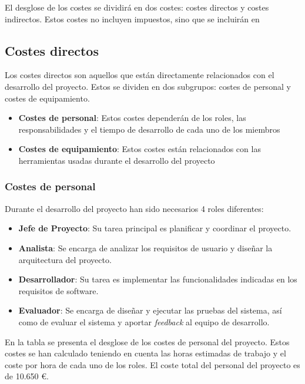 El desglose de los costes se dividirá en dos costes: costes directos y costes indirectos. Estos costes no incluyen impuestos, sino que se incluirán en 

\subsection{Costes directos}\label{subsec:costes_directos}

Los costes directos son aquellos que están directamente relacionados con el desarrollo del proyecto. Estos se dividen en dos subgrupos: costes de personal y costes de equipamiento.
\begin{itemize}
    \item \textbf{Costes de personal}: Estos costes dependerán de los roles, las responsabilidades y el tiempo de desarrollo de cada uno de los miembros
    \item \textbf{Costes de equipamiento}: Estos costes están relacionados con las herramientas usadas durante el desarrollo del proyecto
\end{itemize}

\subsubsection{Costes de personal}

Durante el desarrollo del proyecto han sido necesarios 4 roles diferentes:
\begin{itemize}
    \item \textbf{Jefe de Proyecto}: Su tarea principal es planificar y coordinar el proyecto.
    \item \textbf{Analista}: Se encarga de analizar los requisitos de usuario y diseñar la arquitectura del proyecto.
    \item \textbf{Desarrollador}: Su tarea es implementar las funcionalidades indicadas en los requisitos de software.
    \item \textbf{Evaluador}: Se encarga de diseñar y ejecutar las pruebas del sistema, así como de evaluar el sistema y aportar \textit{feedback} al equipo de desarrollo.
\end{itemize}

En la tabla  se presenta el desglose de los costes de personal del proyecto. Estos costes se han calculado teniendo en cuenta las horas estimadas de trabajo y el coste por hora de cada uno de los roles. El coste total del personal del proyecto es de 10.650 \euro.


